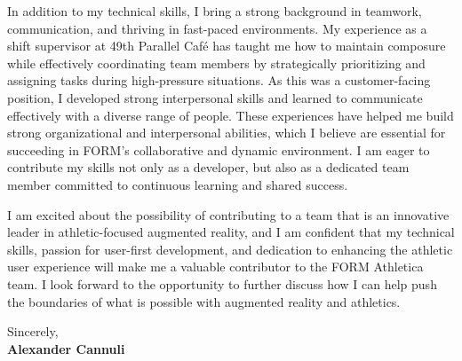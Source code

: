 \documentclass[10pt,a4paper,ragged2e,withhyper]{altacv}
\begin{document}
\vspace{1em}



In addition to my technical skills, I bring a strong background in teamwork, communication, and thriving in fast-paced environments. My experience as a shift supervisor at 49th Parallel Café has taught me how to maintain composure while effectively coordinating team members by strategically prioritizing and assigning tasks during high-pressure situations. As this was a customer-facing position, I developed strong interpersonal skills and learned to communicate effectively with a diverse range of people. These experiences have helped me build strong organizational and interpersonal abilities, which I believe are essential for succeeding in FORM’s collaborative and dynamic environment. I am eager to contribute my skills not only as a developer, but also as a dedicated team member committed to continuous learning and shared success.

\vspace{1em}


I am excited about the possibility of contributing to a team that is an innovative leader in athletic-focused augmented reality, and I am confident that my technical skills, passion for user-first development, and dedication to enhancing the athletic user experience will make me a valuable contributor to the FORM Athletica team. I look forward to the opportunity to further discuss how I can help push the boundaries of what is possible with augmented reality and athletics.




\vspace{2em}

Sincerely,\\[2em]
\textbf{Alexander Cannuli}
\end{document}
